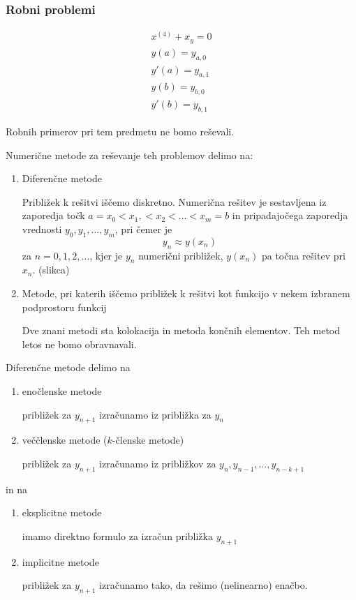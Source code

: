 \documentclass[a4paper,12pt]{article}
\theoremstyle{definition}
\theoremstyle{remark}
\begin{document}
\subsubsection{Robni problemi}

\begin{gather*}
    x^{(4)} + x_y = 0 \\
    y(a) = y_{a, 0} \\
    y'(a) = y_{a, 1} \\
    y(b) = y_{b, 0} \\
    y'(b) = y_{b, 1}
\end{gather*}

Robnih primerov pri tem predmetu ne bomo reševali.

Numerične metode za reševanje teh problemov delimo na:

\begin{enumerate}
    \item Diferenčne metode
    
    Približek k rešitvi iščemo diskretno. Numerična rešitev je sestavljena iz zaporedja točk $a = x_0 < x_1, < x_2 < \dots < x_m = b$ in pripadajočega
    zaporedja vrednosti $y_0, y_1, \dots, y_m$, pri čemer je 
    \begin{equation*}
        y_n \approx y(x_n)
    \end{equation*}
    za $n = 0, 1, 2, \dots$, kjer je $y_n$ numerični približek, $y(x_n)$ pa točna rešitev pri $x_n$.
    (slikca)
    \item Metode, pri katerih iščemo približek k rešitvi kot funkcijo v nekem izbranem podprostoru funkcij
    
    Dve znani metodi sta kolokacija in metoda končnih elementov. Teh metod letos ne bomo obravnavali.
\end{enumerate}


Diferenčne metode delimo na
\begin{enumerate}
    \item enočlenske metode
    
    približek za $y_{n+1}$ izračunamo iz približka za $y_n$
    \item veččlenske metode ($k$-členske metode)
    
    približek za $y_{n+1}$ izračunamo iz približkov za $y_n, y_{n-1}, \dots, y_{n-k+1}$
\end{enumerate}
in na
\begin{enumerate}
    \item eksplicitne metode
    
    imamo direktno formulo za izračun približka $y_{n+1}$
    \item implicitne metode
    
    približek za $y_{n+1}$ izračunamo tako, da rešimo (nelinearno) enačbo.
\end{enumerate}
\end{document}
